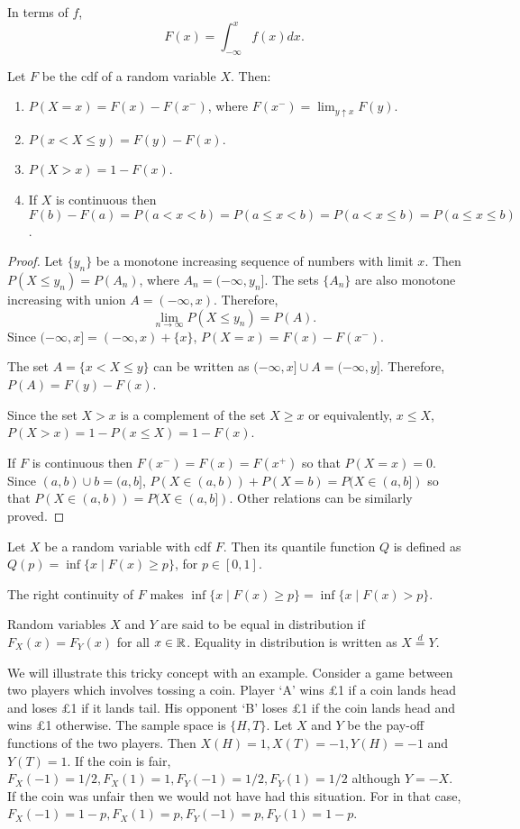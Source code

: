 \documentclass{article}
\begin{document}
In terms of $f$,
\[
F(x) = \int_{-\infty}^x f(x)dx.
\]

\begin{prop}\label{c2p2}
Let $F$ be the cdf of a random variable $X$. Then:
\begin{enumerate}
\item $P(X=x) = F(x) - F(x^-)$, where $F(x^-) = \lim_{y \uparrow x}F(y)$.
\item $P(x < X \le y) = F(y) - F(x)$.
\item $P(X > x) = 1 - F(x)$.
\item If $X$ is continuous then $F(b) - F(a) = P(a < x < b) = P(a \le x < b) =
P(a < x \le b) = P(a \le x \le b)$.
\end{enumerate}
\end{prop}
\begin{proof}
Let $\{y_n\}$ be a monotone increasing sequence of numbers with limit $x$. Then
$P(X \le y_n) = P(A_n)$, where $A_n = (-\infty, y_n]$. The sets $\{A_n\}$ are 
also monotone increasing with union $A = (-\infty, x)$. Therefore,
\[
\lim_{n \rightarrow \infty}P(X \le y_n) = P(A).
\]
Since $(-\infty, x] = (-\infty, x) + \{x\}$, $P(X=x) = F(x) - F(x^-)$.

The set $A = \{x < X \le y\}$ can be written as $(-\infty, x] \cup A = 
(-\infty, y]$. Therefore, $P(A) = F(y) - F(x)$.

Since the set $X > x$ is a complement of the set $X \ge x$ or equivalently,
$x \le X$, $P(X > x) = 1 - P(x \le X) = 1 - F(x)$.

If $F$ is continuous then $F(x^-) = F(x) = F(x^+)$ so that $P(X=x) = 0$. Since
$(a, b) \cup {b} = (a, b]$, $P(X \in (a, b)) + P(X = b) = P(X \in (a, b])$ so 
that $P(X \in (a, b)) = P(X \in (a, b])$. Other relations can be similarly 
proved.
\end{proof}

\begin{defn}\label{c2d9}
Let $X$ be a random variable with cdf $F$. Then its quantile function $Q$ is 
defined as $Q(p) = \inf\{x \;|\; F(x) \ge p\}$, for $p \in [0, 1]$.
\end{defn}
\begin{rem}
The right continuity of $F$ makes $\inf\{x \;|\; F(x) \ge p\} = 
\inf\{x \;|\; F(x) > p\}$.
\end{rem}

\begin{defn}\label{c2d10}
Random variables $X$ and $Y$ are said to be equal in distribution if $F_X(x) = 
F_Y(x)$ for all $x \in \mathbb{R}$. Equality in distribution is written as $X
\stackrel{d}{=} Y$.
\end{defn}
We will illustrate this tricky concept with an example. Consider a game between
two players which involves tossing a coin. Player `A' wins £1 if a coin lands
head and loses £1 if it lands tail. His opponent `B' loses £1 if the coin lands
head and wins £1 otherwise. The sample space is $\{H, T\}$. Let $X$ and $Y$ be 
the pay-off functions of the two players. Then $X(H) = 1, X(T) = -1, Y(H) = -1$
and $Y(T) = 1$. If the coin is fair, $F_X(-1) = 1/2, F_X(1) = 1, F_Y(-1) = 1/2,
F_Y(1) = 1/2$ although $Y = -X$. If the coin was unfair then we would not have
had this situation. For in that case, $F_X(-1) = 1 - p, F_X(1) = p, F_Y(-1) = p,
F_Y(1) = 1 - p$.
\end{document}
